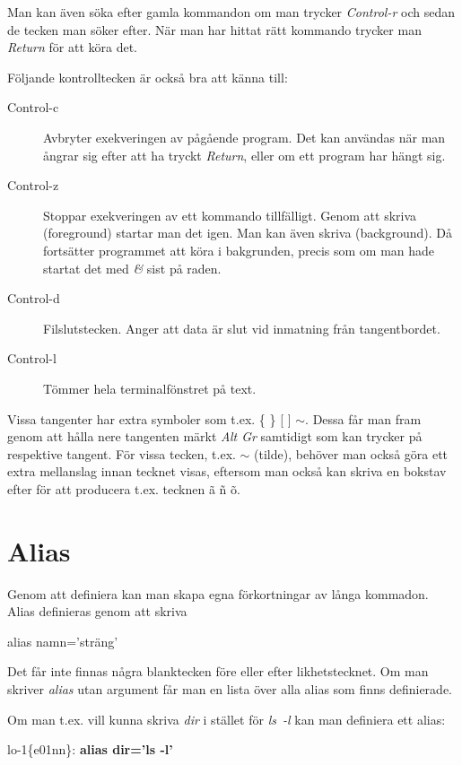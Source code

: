 \documentclass[a4paper,twocolumn]{book}
\begin{document}
Man kan även söka efter gamla kommandon om man trycker \emph{Control-r} och
sedan de tecken man söker efter. När man har hittat rätt kommando trycker man
\emph{Return} för att köra det.

Följande kontrolltecken är också bra att känna till:
\begin{description}
  \item[Control-c] Avbryter exekveringen av pågående program. Det kan
    användas när man ångrar sig efter att ha tryckt \emph{Return}, eller
    om ett program har hängt sig.
  \item[Control-z] Stoppar exekveringen av ett kommando
    tillfälligt. Genom att skriva  (foreground) startar man
    det igen. Man kan även skriva  (background). Då
    fortsätter programmet att köra i bakgrunden, precis som om man hade
    startat det med \emph{\&} sist på raden.
  \item[Control-d] Filslutstecken. Anger att data är slut vid inmatning
    från tangentbordet.
  \item[Control-l] Tömmer hela terminalfönstret på text.
\end{description}

Vissa tangenter har extra symboler som t.ex. \{ \} [ ] $\sim$. Dessa får
man fram genom att hålla nere tangenten märkt \emph{Alt Gr}
samtidigt som kan trycker på respektive tangent. För vissa tecken, t.ex. $\sim$ (tilde),
behöver man också göra ett extra mellanslag innan tecknet visas, eftersom
man också kan skriva en bokstav efter för att producera t.ex. tecknen ã ñ õ.

\section{Alias}

Genom att definiera  kan man skapa egna förkortningar
av långa kommadon. Alias definieras genom att skriva
\begin{ttquote}
  alias namn='sträng'
\end{ttquote}
Det får inte finnas några blanktecken före eller efter
likhetstecknet. Om man skriver \emph{alias} utan argument får man en
lista över alla alias som finns definierade.

Om man t.ex. vill kunna skriva \emph{dir} i stället för \emph{ls~-l}
kan man definiera ett alias:
\begin{example}
  lo-1\{e01nn\}: \textbf{alias dir='ls -l'}
\end{example}
\end{document}

